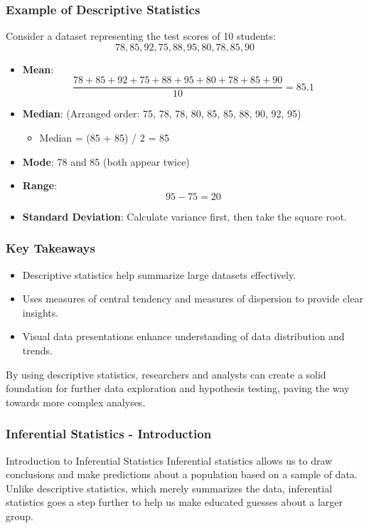 \documentclass[aspectratio=169]{beamer}
\begin{document}
\begin{frame}[fragile]
    \frametitle{Example of Descriptive Statistics}
    Consider a dataset representing the test scores of 10 students: 
    \[
    78, 85, 92, 75, 88, 95, 80, 78, 85, 90
    \]
    
    \begin{itemize}
        \item \textbf{Mean}:
        \[
        \frac{78 + 85 + 92 + 75 + 88 + 95 + 80 + 78 + 85 + 90}{10} = 85.1
        \]
        
        \item \textbf{Median}: (Arranged order: 75, 78, 78, 80, 85, 85, 88, 90, 92, 95) 
        \begin{itemize}
            \item Median = (85 + 85) / 2 = 85
        \end{itemize}
        
        \item \textbf{Mode}: 78 and 85 (both appear twice)
        
        \item \textbf{Range}:
        \[
        95 - 75 = 20
        \]
        
        \item \textbf{Standard Deviation}: Calculate variance first, then take the square root.
    \end{itemize}
\end{frame}

\begin{frame}[fragile]
    \frametitle{Key Takeaways}
    \begin{itemize}
        \item Descriptive statistics help summarize large datasets effectively.
        \item Uses measures of central tendency and measures of dispersion to provide clear insights.
        \item Visual data presentations enhance understanding of data distribution and trends.
    \end{itemize}
    
    By using descriptive statistics, researchers and analysts can create a solid foundation for further data exploration and hypothesis testing, paving the way towards more complex analyses.
\end{frame}

\begin{frame}[fragile]
    \frametitle{Inferential Statistics - Introduction}
    \begin{block}{Introduction to Inferential Statistics}
        Inferential statistics allows us to draw conclusions and make predictions about a population based on a sample of data. Unlike descriptive statistics, which merely summarizes the data, inferential statistics goes a step further to help us make educated guesses about a larger group.
    \end{block}
\end{frame}
\end{document}
